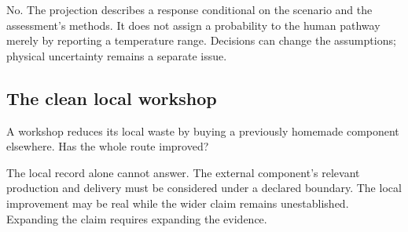 No. The projection describes a response conditional on the scenario and the assessment's methods. It does not assign a probability to the human pathway merely by reporting a temperature range. Decisions can change the assumptions; physical uncertainty remains a separate issue.

\subsection{The clean local workshop}
A workshop reduces its local waste by buying a previously homemade component elsewhere. Has the whole route improved?

The local record alone cannot answer. The external component's relevant production and delivery must be considered under a declared boundary. The local improvement may be real while the wider claim remains unestablished. Expanding the claim requires expanding the evidence.
